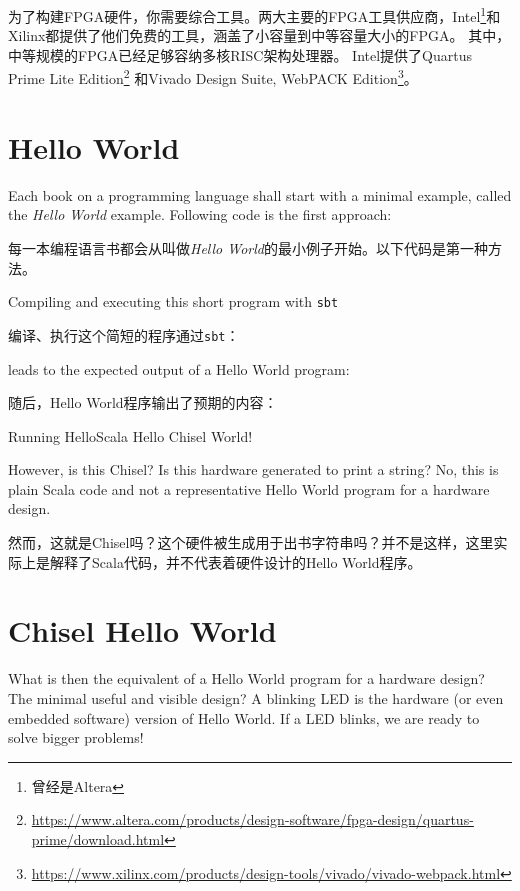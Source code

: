\documentclass[%
    10pt,
    headinclude, footexclude,
    openright, %
    notitlepage,
    cleardoubleempty,
    headsepline,
    pointlessnumbers,
    bibtotoc, idxtotoc,
    ]{scrbook}
\newcommand{\code}[1]{{\small{\texttt{#1}}}}
\newcommand{\myref}[2]{\href{#1}{#2}}
\renewcommand{\myref}[2]{{#2}{\footnote{\url{#1}}}}
\begin{document}
为了构建FPGA硬件，你需要综合工具。两大主要的FPGA工具供应商，Intel\footnote{曾经是Altera}和Xilinx都提供了他们免费的工具，涵盖了小容量到中等容量大小的FPGA。
其中，中等规模的FPGA已经足够容纳多核RISC架构处理器。
Intel提供了\myref{https://www.altera.com/products/design-software/fpga-design/quartus-prime/download.html}{Quartus Prime Lite Edition} 
和\myref{https://www.xilinx.com/products/design-tools/vivado/vivado-webpack.html}{Vivado Design Suite, WebPACK Edition}。


\section{Hello World}

Each book on a programming language shall start with a minimal example,
called the \emph{Hello World} example. Following code is the first approach:

每一本编程语言书都会从叫做\emph{Hello World}的最小例子开始。以下代码是第一种方法。




\noindent Compiling and executing this short program with \code{sbt}

编译、执行这个简短的程序通过\code{sbt}：


\noindent leads to the expected output of a Hello World program:

随后，Hello World程序输出了预期的内容：

\begin{chisel}
[info] Running HelloScala
Hello Chisel World!
\end{chisel}

\noindent However, is this Chisel? Is this hardware generated to print a string?
No, this is plain Scala code and not a representative Hello World
program for a hardware design.

然而，这就是Chisel吗？这个硬件被生成用于出书字符串吗？并不是这样，这里实际上是解释了Scala代码，并不代表着硬件设计的Hello World程序。


\section{Chisel Hello World}

What is then the equivalent of a Hello World program for a hardware design?
The minimal useful and visible design? A blinking LED is the hardware (or even
embedded software) version of Hello World. If a LED blinks, we are ready to
solve bigger problems!
\end{document}
